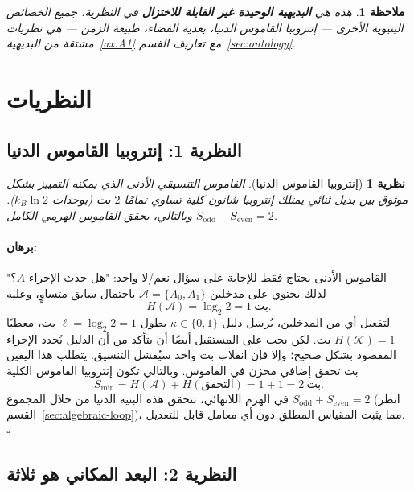\documentclass[11pt,a4paper]{article}
\newtheorem{theorem}{نظرية}
\newtheorem{remark}{ملاحظة}
\renewenvironment{proof}{\paragraph{برهان:}}{\hfill$\square$}
\begin{document}
	\begin{remark}
		هذه هي \textbf{البديهية الوحيدة غير القابلة للاختزال} في النظرية. جميع الخصائص البنيوية الأخرى — إنتروبيا القاموس الدنيا، بعدية الفضاء، طبيعة الزمن — هي نظريات مشتقة من البديهية~\ref{ax:A1} مع تعاريف القسم~\ref{sec:ontology}.
	\end{remark}
	
	\section{النظريات}
	\label{sec:theorems}
	
	\subsection{النظرية 1: إنتروبيا القاموس الدنيا}
	
	\begin{theorem}[إنتروبيا القاموس الدنيا]
		\label{thm:minimal-dict}
		القاموس التنسيقي الأدنى الذي يمكنه التمييز بشكل موثوق بين بديل ثنائي يمتلك إنتروبيا شانون كلية تساوي تمامًا \(2\) بت (بوحدات \(k_B\ln 2\)). وبالتالي، يحقق القاموس الهرمي الكامل \(S_{\mathrm{odd}} + S_{\mathrm{even}} = 2\).
	\end{theorem}
	
	\begin{proof}
		القاموس الأدنى يحتاج فقط للإجابة على سؤال نعم/لا واحد: "هل حدث الإجراء \(A\)؟" لذلك يحتوي على مدخلين \(\mathcal{A} = \{A_0, A_1\}\) باحتمال سابق متساوٍ، وعليه
		\[
		H(\mathcal{A}) = \log_2 2 = 1\ \text{بت}.
		\]
		لتفعيل أي من المدخلين، يُرسل دليل \(\kappa \in \{0,1\}\) بطول \(\ell = \log_2 2 = 1\) بت، معطيًا \(H(\mathcal{K}) = 1\) بت. لكن يجب على المستقبل أيضًا أن يتأكد من أن الدليل يُحدد الإجراء المقصود بشكل صحيح؛ وإلا فإن انقلاب بت واحد سيُفشل التنسيق. يتطلب هذا اليقين بت تحقق إضافي مخزن في القاموس. وبالتالي تكون إنتروبيا القاموس الكلية
		\[
		S_{\min} = H(\mathcal{A}) + H(\text{التحقق}) = 1 + 1 = 2\ \text{بت}.
		\]
		في الهرم اللانهائي، تتحقق هذه البنية الدنيا من خلال المجموع \(S_{\mathrm{odd}} + S_{\mathrm{even}} = 2\) (انظر القسم~\ref{sec:algebraic-loop})، مما يثبت المقياس المطلق دون أي معامل قابل للتعديل.
	\end{proof}
	
	\subsection{النظرية 2: البعد المكاني هو ثلاثة}
	
\end{document}
